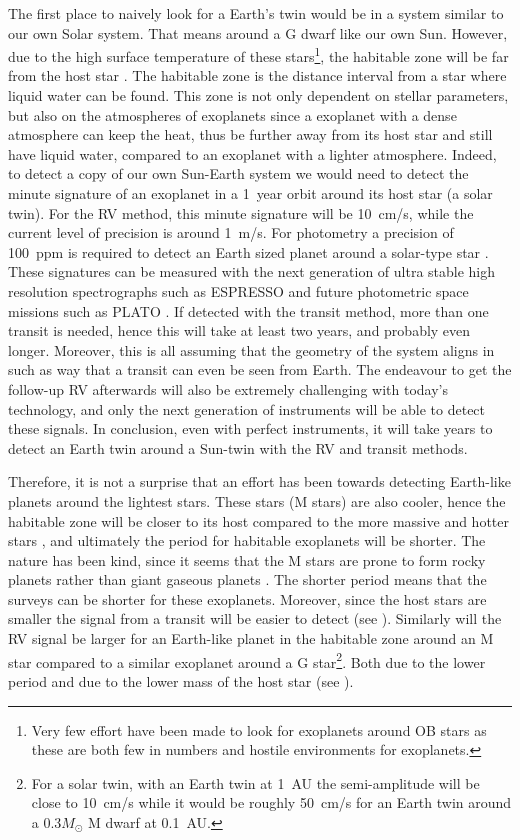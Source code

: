 The first place to naively look for a Earth's twin would be in a system similar to our own Solar
system. That means around a G dwarf like our own Sun. However, due to the high surface temperature
of these stars\footnote{Very few effort have been made to look for exoplanets around OB stars as
these are both few in numbers and hostile environments for exoplanets.}, the habitable zone will be
far from the host star \citep[see e.g.][]{Kasting1993}. The habitable zone is the distance interval
from a star where liquid water can be found. This zone is not only dependent on stellar parameters,
but also on the atmospheres of exoplanets since a exoplanet with a dense atmosphere can keep the
heat, thus be further away from its host star and still have liquid water, compared to an exoplanet
with a lighter atmosphere. Indeed, to detect a copy of our own Sun-Earth system we would need to
detect the minute signature of an exoplanet in a \SI{1}{year} orbit around its host star (a solar
twin). For the RV method, this minute signature will be \SI{10}{cm/s}, while the current level of
precision is around \SI{1}{m/s}. For photometry a precision of \SI{100}{ppm} is required to detect
an Earth sized planet around a solar-type star \citep{Borucki2017}. These signatures can be measured
with the next generation of ultra stable high resolution spectrographs such as ESPRESSO
\citep{ESPRESSO} and future photometric space missions such as PLATO \citep{PLATO}. If detected with
the transit method, more than one transit is needed, hence this will take at least two years, and
probably even longer. Moreover, this is all assuming that the geometry of the system aligns in such
as way that a transit can even be seen from Earth. The endeavour to get the follow-up RV afterwards
will also be extremely challenging with today's technology, and only the next generation of
instruments will be able to detect these signals. In conclusion, even with perfect instruments, it
will take years to detect an Earth twin around a Sun-twin with the RV and transit methods.

Therefore, it is not a surprise that an effort has been towards detecting Earth-like planets around
the lightest stars. These stars (M stars) are also cooler, hence the habitable zone will be closer
to its host compared to the more massive and hotter stars \citep{Kasting1997}, and ultimately the
period for habitable exoplanets will be shorter. The nature has been kind, since it seems that the M
stars are prone to form rocky planets rather than giant gaseous planets
\citep{Bonfils2013,Delfosse2013}. The shorter period means that the surveys can be shorter for these
exoplanets. Moreover, since the host stars are smaller the signal from a transit will be easier to
detect (see ). Similarly will the RV signal be larger for an Earth-like planet in
the habitable zone around an M star compared to a similar exoplanet around a G star\footnote{ For a
solar twin, with an Earth twin at \SI{1}{AU} the semi-amplitude will be close to \SI{10}{cm/s} while
it would be roughly \SI{50}{cm/s} for an Earth twin around a 0.3$M_\odot$ M dwarf at \SI{0.1}{AU}.}.
Both due to the lower period and due to the lower mass of the host star (see ).

